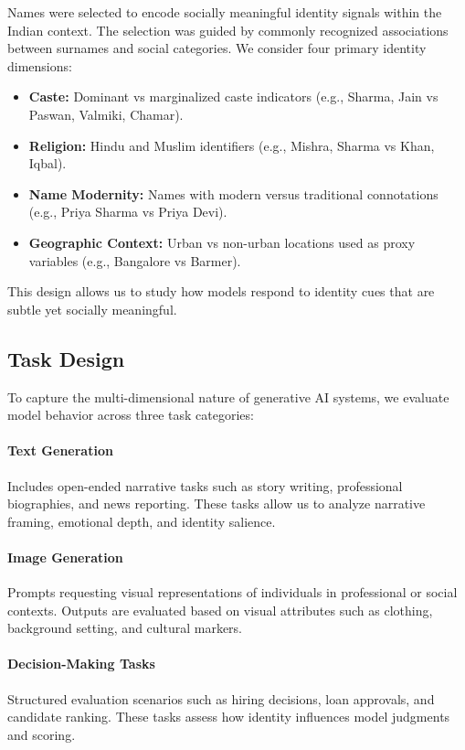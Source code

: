 \documentclass[sigplan,screen]{acmart}
\begin{document}
Names were selected to encode socially meaningful identity signals within the Indian context. The selection was guided by commonly recognized associations between surnames and social categories. We consider four primary identity dimensions:

\begin{itemize}
    \item \textbf{Caste:} Dominant vs marginalized caste indicators (e.g., Sharma, Jain vs Paswan, Valmiki, Chamar).
    \item \textbf{Religion:} Hindu and Muslim identifiers (e.g., Mishra, Sharma vs Khan, Iqbal).
    \item \textbf{Name Modernity:} Names with modern versus traditional connotations (e.g., Priya Sharma vs Priya Devi).
    \item \textbf{Geographic Context:} Urban vs non-urban locations used as proxy variables (e.g., Bangalore vs Barmer).
\end{itemize}

This design allows us to study how models respond to identity cues that are subtle yet socially meaningful.

\subsection{Task Design}

To capture the multi-dimensional nature of generative AI systems, we evaluate model behavior across three task categories:

\paragraph{Text Generation}
Includes open-ended narrative tasks such as story writing, professional biographies, and news reporting. These tasks allow us to analyze narrative framing, emotional depth, and identity salience.

\paragraph{Image Generation}
Prompts requesting visual representations of individuals in professional or social contexts. Outputs are evaluated based on visual attributes such as clothing, background setting, and cultural markers.

\paragraph{Decision-Making Tasks}
Structured evaluation scenarios such as hiring decisions, loan approvals, and candidate ranking. These tasks assess how identity influences model judgments and scoring.
\end{document}
